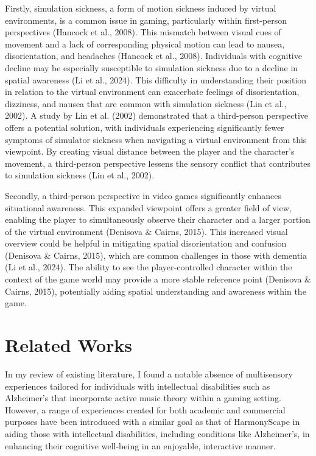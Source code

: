 \documentclass{l4proj}
\begin{document}
Firstly, simulation sickness, a form of motion sickness induced by virtual environments, is a common issue in gaming, particularly within first-person perspectives (Hancock et al., 2008). This mismatch between visual cues of movement and a lack of corresponding physical motion can lead to nausea, disorientation, and headaches (Hancock et al., 2008). Individuals with cognitive decline may be especially susceptible to simulation sickness due to a decline in spatial awareness (Li et al., 2024). This difficulty in understanding their position in relation to the virtual environment can exacerbate feelings of disorientation, dizziness, and nausea that are common with simulation sickness (Lin et al., 2002). A study by Lin et al. (2002) demonstrated that a third-person perspective offers a potential solution, with individuals experiencing significantly fewer symptoms of simulator sickness when navigating a virtual environment from this viewpoint. By creating visual distance between the player and the character's movement, a third-person perspective lessens the sensory conflict that contributes to simulation sickness (Lin et al., 2002).

Secondly, a third-person perspective in video games significantly enhances situational awareness. This expanded viewpoint offers a greater field of view, enabling the player to simultaneously observe their character and a larger portion of the virtual environment (Denisova \& Cairns, 2015). This increased visual overview could be helpful in mitigating spatial disorientation and confusion (Denisova \& Cairns, 2015), which are common challenges in those with dementia (Li et al., 2024). The ability to see the player-controlled character within the context of the game world may provide a more stable reference point (Denisova \& Cairns, 2015), potentially aiding spatial understanding and awareness within the game.


\section{Related Works}
In my review of existing literature, I found a notable absence of multisensory experiences tailored for individuals with intellectual disabilities such as Alzheimer’s that incorporate active music theory within a gaming setting. However, a range of experiences created for both academic and commercial purposes have been introduced with a similar goal as that of HarmonyScape in aiding those with intellectual disabilities, including conditions like Alzheimer’s, in enhancing their cognitive well-being in an enjoyable, interactive manner.
\end{document}

